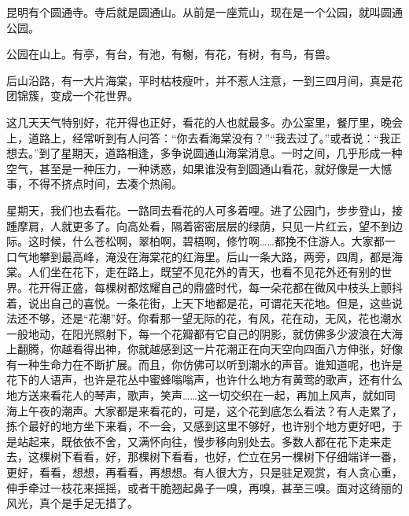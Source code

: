 \documentclass[12pt,UTF-8,openany]{ctexbook}
\begin{document}
\begin{large}
    
    昆明有个圆通寺。寺后就是圆通山。从前是一座荒山，现在是一个公园，就叫圆通公园。
    
    公园在山上。有亭，有台，有池，有榭，有花，有树，有鸟，有兽。
    
    后山沿路，有一大片海棠，平时枯枝瘦叶，并不惹人注意，一到三四月间，真是花团锦簇，变成一个花世界。
    
    这几天天气特别好，花开得也正好，看花的人也就最多。办公室里，餐厅里，晚会上，道路上，经常听到有人问答：“你去看海棠没有？”“我去过了。”或者说：“我正想去。”到了星期天，道路相逢，多争说圆通山海棠消息。一时之间，几乎形成一种空气，甚至是一种压力，一种诱惑，如果谁没有到圆通山看花，就好像是一大憾事，不得不挤点时间，去凑个热闹。
    
    星期天，我们也去看花。一路同去看花的人可多着哩。进了公园门，步步登山，接踵摩肩，人就更多了。向高处看，隔着密密层层的绿荫，只见一片红云，望不到边际。这时候，什么苍松啊，翠柏啊，碧梧啊，修竹啊……都挽不住游人。大家都一口气地攀到最高峰，淹没在海棠花的红海里。后山一条大路，两旁，四周，都是海棠。人们坐在花下，走在路上，既望不见花外的青天，也看不见花外还有别的世界。花开得正盛，每棵树都炫耀自己的鼎盛时代，每一朵花都在微风中枝头上颤抖着，说出自己的喜悦。一条花街，上天下地都是花，可谓花天花地。但是，这些说法还不够，还是“花潮”好。你看那一望无际的花，有风，花在动，无风，花也潮水一般地动，在阳光照射下，每一个花瓣都有它自己的阴影，就仿佛多少波浪在大海上翻腾，你越看得出神，你就越感到这一片花潮正在向天空向四面八方伸张，好像有一种生命力在不断扩展。而且，你仿佛可以听到潮水的声音。谁知道呢，也许是花下的人语声，也许是花丛中蜜蜂嗡嗡声，也许什么地方有黄莺的歌声，还有什么地方送来看花人的琴声，歌声，笑声……这一切交织在一起，再加上风声，就如同海上午夜的潮声。大家都是来看花的，可是，这个花到底怎么看法？有人走累了，拣个最好的地方坐下来看，不一会，又感到这里不够好，也许别个地方更好吧，于是站起来，既依依不舍，又满怀向往，慢步移向别处去。多数人都在花下走来走去，这棵树下看看，好，那棵树下看看，也好，伫立在另一棵树下仔细端详一番，更好，看看，想想，再看看，再想想。有人很大方，只是驻足观赏，有人贪心重，伸手牵过一枝花来摇摇，或者干脆翘起鼻子一嗅，再嗅，甚至三嗅。面对这绮丽的风光，真个是手足无措了。
    

\end{large}
\end{document}

